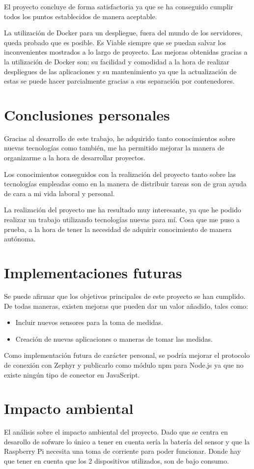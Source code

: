 El proyecto concluye de forma satisfactoria ya que se ha conseguido cumplir todos los puntos establecidos de manera aceptable. 

La utilización de Docker para un despliegue, fuera del mundo de los servidores, queda probado que es posible. Es Viable siempre que se puedan salvar los inconvenientes mostrados a lo largo de proyecto. Las mejoras obtenidas gracias a la utilización de Docker son: su facilidad y comodidad a la hora de realizar despliegues de las aplicaciones y su mantenimiento ya que la actualización de estas se puede hacer parcialmente gracias a sus separación por contenedores. 

\section{Conclusiones personales}

Gracias al desarrollo de este trabajo, he adquirido tanto conocimientos sobre
nuevas tecnologías como también, me ha permitido mejorar la manera de
organizarme a la hora de desarrollar proyectos.

\pagebreak
Los conocimientos conseguidos con la realización del proyecto tanto sobre las tecnologías empleadas como en la manera de distribuir tareas son de gran ayuda de cara a mi vida laboral y personal. 

La realización del proyecto me ha resultado muy interesante, ya que he podido realizar un trabajo utilizando tecnologías nuevas para mí. Cosa que me puso a prueba, a la hora de tener la necesidad de adquirir conocimiento de manera autónoma. 

\section{Implementaciones futuras}

Se puede afirmar que los objetivos principales de este proyecto se han cumplido.
De todas maneras, existen mejoras que pueden dar un valor añadido, tales como:

\begin{itemize}
\item Incluir nuevos sensores para la toma de medidas. 
\item Creación de nuevas aplicaciones o maneras de tomar las medidas.
\end{itemize}

Como implementación futura de carácter personal, se podría mejorar el protocolo de conexión con Zephyr y publicarlo como módulo npm para Node.js ya que no existe ningún tipo de conector en JavaScript.

\section{Impacto ambiental} 

El análisis sobre el impacto ambiental del proyecto. Dado que se centra en desarollo de sofware lo único a tener en cuenta sería la batería del sensor y que la Raspberry Pi necesita una toma de corriente para poder funcionar. Donde hay que tener en cuenta que los 2 dispositivos utilizados, son de bajo consumo. 